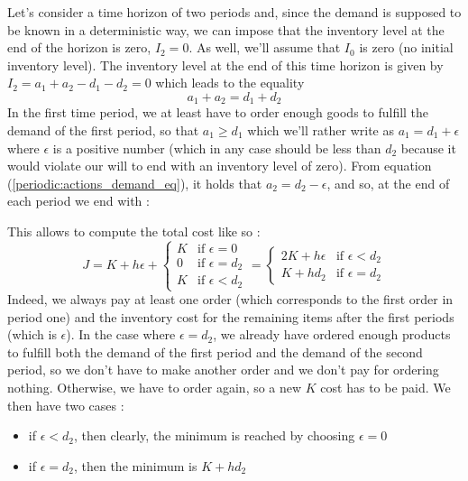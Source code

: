 Let's consider a time horizon of two periods and, since the demand is supposed to be known in a deterministic way, we can impose that the inventory level at the end of the horizon is zero, $I_2=0$. As well, we'll assume that $I_0$ is zero (no initial inventory level). The inventory level at the end of this time horizon is given by $I_2 = a_1 + a_2 - d_1 - d_2 = 0$ which leads to the equality \begin{equation} a_1 + a_2 = d_1 + d_2 \label{periodic:actions_demand_eq} \end{equation}
In the first time period, we at least have to order enough goods to fulfill the demand of the first period, so that $a_1\ge d_1$ which we'll rather write as $a_1 = d_1 + \epsilon$ where $\epsilon$ is a positive number (which in any case should be less than $d_2$ because it would violate our will to end with an inventory level of zero). From equation (\ref{periodic:actions_demand_eq}), it holds that $a_2 = d_2 - \epsilon$, and so, at the end of each period we end with :

\begin{center}
\end{center}

This allows to compute the total cost like so :
\[
    J = K + h\epsilon +
    \begin{cases}
        K &\textrm{if }\epsilon = 0\\
        0 &\textrm{if }\epsilon = d_2\\
        K &\textrm{if }\epsilon < d_2
    \end{cases}
    = \begin{cases}
        2K+h\epsilon&\textrm{if }\epsilon<d_2\\
        K+hd_2&\textrm{if }\epsilon = d_2
    \end{cases}
\]
Indeed, we always pay at least one order (which corresponds to the first order in period one) and the inventory cost for the remaining items after the first periods (which is $\epsilon$). In the case where $\epsilon = d_2$, we already have ordered enough products to fulfill both the demand of the first period and the demand of the second period, so we don't have to make another order and we don't pay for ordering nothing. Otherwise, we have to order again, so a new $K$ cost has to be paid. We then have two cases :
\begin{itemize}
    \item if $\epsilon < d_2$, then clearly, the minimum is reached by choosing $\epsilon = 0$
    \item if $\epsilon = d_2$, then the minimum is $K+hd_2$
\end{itemize}

